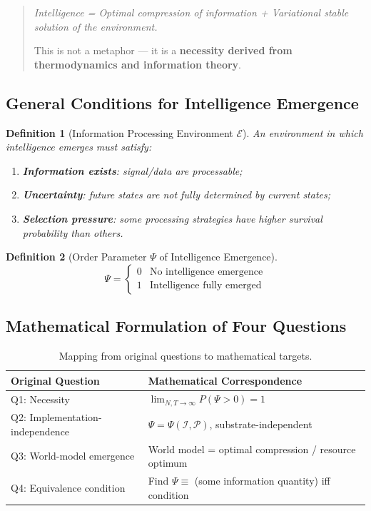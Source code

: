 \documentclass[12pt, a4paper]{article}
\newtheorem{definition}{Definition}[section]
\newcommand{\calI}{\mathcal{I}}
\newcommand{\calP}{\mathcal{P}}
\newcommand{\calE}{\mathcal{E}}
\begin{document}
\begin{quote}
\textit{Intelligence = Optimal compression of information + Variational stable solution of the environment.}

This is not a metaphor --- it is a \textbf{necessity derived from thermodynamics and information theory}.
\end{quote}

\subsection{General Conditions for Intelligence Emergence}

\begin{definition}[Information Processing Environment $\calE$]\label{def:environment}
An environment in which intelligence emerges must satisfy:
\begin{enumerate}[label=\arabic*.]
\item \textbf{Information exists}: signal/data are processable;
\item \textbf{Uncertainty}: future states are not fully determined by current states;
\item \textbf{Selection pressure}: some processing strategies have higher survival probability than others.
\end{enumerate}
\end{definition}

\begin{definition}[Order Parameter $\Psi$ of Intelligence Emergence]\label{def:order-param}
\begin{equation}
\Psi = \begin{cases}
0 & \text{No intelligence emergence} \\
1 & \text{Intelligence fully emerged}
\end{cases}
\end{equation}
\end{definition}

\subsection{Mathematical Formulation of Four Questions}

\begin{table}[h]
\centering
\begin{tabular}{ll}
\toprule
\textbf{Original Question} & \textbf{Mathematical Correspondence} \\
\midrule
Q1: Necessity & $\displaystyle\lim_{N,T\to\infty} P(\Psi > 0) = 1$ \\
Q2: Implementation-independence & $\Psi = \Psi(\calI,\calP)$, substrate-independent \\
Q3: World-model emergence & World model = optimal compression / resource optimum \\
Q4: Equivalence condition & Find $\Psi \equiv$ (some information quantity) iff condition \\
\bottomrule
\end{tabular}
\caption{Mapping from original questions to mathematical targets.}
\end{table}
\end{document}
